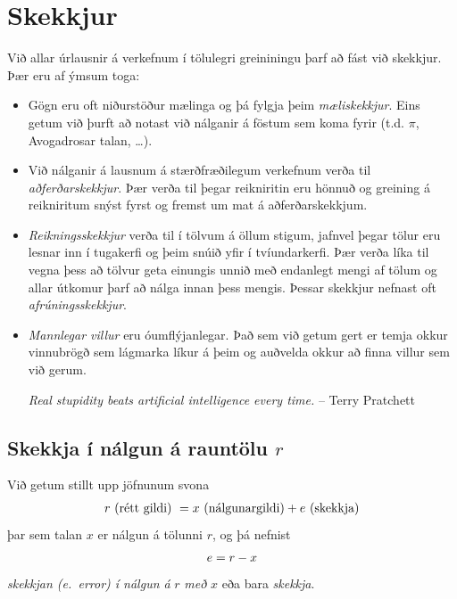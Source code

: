 \documentclass[letterpaper,10pt,icelandic]{sphinxmanual}
\begin{document}
\section{Skekkjur}
\label{kafli01:index-4}\label{kafli01:skekkjur}
Við allar úrlausnir á verkefnum í tölulegri greininingu þarf að fást við
skekkjur. Þær eru af ýmsum toga:
\begin{itemize}
\item {} 
Gögn eru oft niðurstöður mælinga og þá fylgja þeim \emph{mæliskekkjur}.
Eins getum við þurft að notast við nálganir á föstum sem koma fyrir
(t.d. \(\pi\), Avogadrosar talan, …).

\item {} 
Við nálganir á lausnum á stærðfræðilegum verkefnum verða til
\emph{aðferðarskekkjur}. Þær verða til þegar reikniritin eru hönnuð og
greining á reikniritum snýst fyrst og fremst um mat á
aðferðarskekkjum.

\item {} 
\emph{Reikningsskekkjur} verða til í tölvum á öllum stigum, jafnvel þegar
tölur eru lesnar inn í tugakerfi og þeim snúið yfir í tvíundarkerfi.
Þær verða líka til vegna þess að tölvur geta einungis unnið með
endanlegt mengi af tölum og allar útkomur þarf að nálga innan þess
mengis. Þessar skekkjur nefnast oft \emph{afrúningsskekkjur}.

\item {} 
\emph{Mannlegar villur} eru óumflýjanlegar. Það sem við getum gert er
temja okkur vinnubrögð sem lágmarka líkur á þeim og auðvelda okkur að
finna villur sem við gerum.

\emph{Real stupidity beats artificial intelligence every time.}
-- Terry Pratchett

\end{itemize}


\subsection{Skekkja í nálgun á rauntölu \(r\)}
\label{kafli01:index-5}\label{kafli01:skekkja-i-nalgun-a-rauntolu}
Við getum stillt upp jöfnunum svona
\begin{gather}
\begin{split}r \text{ (rétt gildi) } = x\text{ (nálgunargildi)} +
    e \text{ (skekkja)}\end{split}\notag
\end{gather}
þar sem talan \(x\) er nálgun á tölunni \(r\), og þá nefnist
\begin{gather}
\begin{split}e=r-x\end{split}\notag
\end{gather}
\emph{skekkjan (e. error) í nálgun á} \(r\) \emph{með} \(x\) eða bara
\emph{skekkja}.
\end{document}
